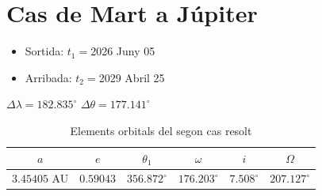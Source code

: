 \section{Cas de Mart a Júpiter}
\begin{itemize}
	\item Sortida: $t_{1}=$2026 Juny 05
	\item Arribada: $t_{2}=$2029 Abril 25
\end{itemize}
$\Delta\lambda=182.835^{\circ}$
$\Delta\theta=177.141^{\circ}$
\begin{table}[h!]
	\centering
	\begin{tabular}{ |c|c|c|c|c|c|}
		\hline
		$a$ & $e$ & $\theta_{1}$ & $\omega$ & $i$ & $\Omega$ \\ \hline
		$3.45405$ AU  & $0.59043$ & $356.872^{\circ}$ & $176.203^{\circ}$ & $7.508^{\circ}$ & $207.127^{\circ}$ \\ \hline
	\end{tabular}
	\caption{Elements orbitals del segon cas resolt}
\end{table}

